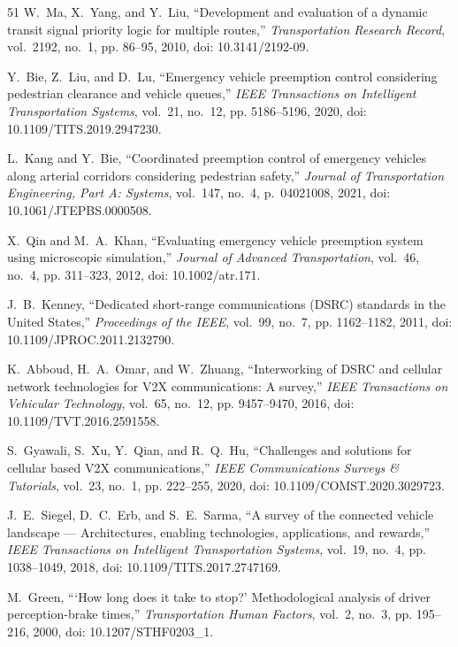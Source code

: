 \documentclass[journal,10pt,twocolumn]{IEEEtran}
\begin{document}
\begin{thebibliography}{51}
W.~Ma, X.~Yang, and Y.~Liu, ``Development and evaluation of a dynamic transit signal priority logic for multiple routes,'' \emph{Transportation Research Record}, vol.~2192, no.~1, pp. 86--95, 2010, doi: 10.3141/2192-09.

Y.~Bie, Z.~Liu, and D.~Lu, ``Emergency vehicle preemption control considering pedestrian clearance and vehicle queues,'' \emph{IEEE Transactions on Intelligent Transportation Systems}, vol.~21, no.~12, pp. 5186--5196, 2020, doi: 10.1109/TITS.2019.2947230.

L.~Kang and Y.~Bie, ``Coordinated preemption control of emergency vehicles along arterial corridors considering pedestrian safety,'' \emph{Journal of Transportation Engineering, Part A: Systems}, vol.~147, no.~4, p.~04021008, 2021, doi: 10.1061/JTEPBS.0000508.

X.~Qin and M.~A.~Khan, ``Evaluating emergency vehicle preemption system using microscopic simulation,'' \emph{Journal of Advanced Transportation}, vol.~46, no.~4, pp. 311--323, 2012, doi: 10.1002/atr.171.

J.~B.~Kenney, ``Dedicated short-range communications (DSRC) standards in the United States,'' \emph{Proceedings of the IEEE}, vol.~99, no.~7, pp. 1162--1182, 2011, doi: 10.1109/JPROC.2011.2132790.

K.~Abboud, H.~A.~Omar, and W.~Zhuang, ``Interworking of DSRC and cellular network technologies for V2X communications: A survey,'' \emph{IEEE Transactions on Vehicular Technology}, vol.~65, no.~12, pp. 9457--9470, 2016, doi: 10.1109/TVT.2016.2591558.

S.~Gyawali, S.~Xu, Y.~Qian, and R.~Q.~Hu, ``Challenges and solutions for cellular based V2X communications,'' \emph{IEEE Communications Surveys \& Tutorials}, vol.~23, no.~1, pp. 222--255, 2020, doi: 10.1109/COMST.2020.3029723.

J.~E.~Siegel, D.~C.~Erb, and S.~E.~Sarma, ``A survey of the connected vehicle landscape --- Architectures, enabling technologies, applications, and rewards,'' \emph{IEEE Transactions on Intelligent Transportation Systems}, vol.~19, no.~4, pp. 1038--1049, 2018, doi: 10.1109/TITS.2017.2747169.

M.~Green, ```How long does it take to stop?' Methodological analysis of driver perception-brake times,'' \emph{Transportation Human Factors}, vol.~2, no.~3, pp. 195--216, 2000, doi: 10.1207/STHF0203\_1.


\end{thebibliography}
\end{document}
